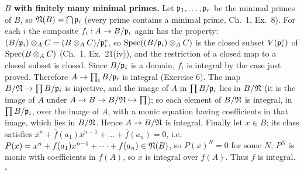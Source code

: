 \documentclass[11pt]{article}
\begin{document}
\textbf{$B$ with finitely many minimal primes.} Let $\mathfrak p_1,\dots,\mathfrak p_r$ be the minimal primes of $B$, so $\mathfrak N(B)=\bigcap\mathfrak p_i$ (every prime contains a minimal prime, Ch.~1, Ex.~8). For each $i$ the composite $f_i:A\to B/\mathfrak p_i$ again has the property: $(B/\mathfrak p_i)\otimes_AC=(B\otimes_AC)/\mathfrak p_i^e$, so $\operatorname{Spec}((B/\mathfrak p_i)\otimes_AC)$ is the closed subset $V(\mathfrak p_i^e)$ of $\operatorname{Spec}(B\otimes_AC)$ (Ch.~1, Ex.~21(iv)), and the restriction of a closed map to a closed subset is closed. Since $B/\mathfrak p_i$ is a domain, $f_i$ is integral by the case just proved. Therefore $A\to\prod_i B/\mathfrak p_i$ is integral (Exercise 6). The map $B/\mathfrak N\to\prod B/\mathfrak p_i$ is injective, and the image of $A$ in $\prod B/\mathfrak p_i$ lies in $B/\mathfrak N$ (it is the image of $A$ under $A\to B\to B/\mathfrak N\hookrightarrow\prod$); so each element of $B/\mathfrak N$ is integral, in $\prod B/\mathfrak p_i$, over the image of $A$, with a monic equation having coefficients in that image, which lies in $B/\mathfrak N$. Hence $A\to B/\mathfrak N$ is integral. Finally let $x\in B$; its class satisfies $\bar x^n+\bar f(a_1)\bar x^{n-1}+\dots+\bar f(a_n)=0$, i.e.\ $P(x)=x^n+f(a_1)x^{n-1}+\dots+f(a_n)\in\mathfrak N(B)$, so $P(x)^N=0$ for some $N$; $P^N$ is monic with coefficients in $f(A)$, so $x$ is integral over $f(A)$. Thus $f$ is integral. \hfill$\square$
\end{document}
